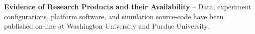\textbf{Evidence of Research Products and their Availability} -- Data, experiment configurations, platform software, and simulation source-code have been published on-line at Washington University and Purdue University.

\begin{comment}
\vspace{0.1in}
\noindent
{\large\bf Very Energetic Radiation Imaging Telescope Array (VERITAS) Project}
{\bf (J. Buckley)}

This work was covered by a combination of a DOE research grant as well
as project funds in the form of DOE and NSF/Physics subcontracts
through the Smithsonian Astrophysical Observatory project office.

\textbf{Intellectual Merit} -- Significant products of the
work include the VERITAS FADC electronics and a number of scientific
results summarized in
\cite{2016MNRAS.461..202A,2016arXiv160901692A,2016arXiv160806464A,2016arXiv160801569A,2016MNRAS.459.2550A,2016ApJ...821..129A,2016ApJ...819..156B,2016ApJ...818L..33A,2016ApJ...817L...7A,2015ApJ...815L..22A,2015PhRvL.115u1103C,2015PhRvD..91l9903A,2015A&A...578A..22A,2015A&A...576A.126A,2015PDU.....7...16B,2015ApJ...800...61A,2015ApJ...799....7A,2014ApJ...797...89A,2014ApJ...795L...3A,2014ApJ...790..149A,2014ApJ...788..158A,2014ApJ...788...78A,2014ApJ...787..166A,2014ApJ...783...16A,2014ApJ...782...13A,2014APh....54....1A,2014arXiv1401.6085F,2014ApJ...780..168A,2013ApJ...779...92A,2013arXiv1310.8621A,2013arXiv1310.7040B,2013arXiv1310.5662B,2013ApJ...776...69A,2013arXiv1308.6173V,2013arXiv1307.4962P,2013arXiv1307.2807D,2013ApJ...770...93A,2013arXiv1305.0302W,2013arXiv1304.6367S,2013APh....43....3A,2013ApJ...764...38A,2013ApJ...762...92A}.
A founding member of VERITAS, Dr.\ Buckley was responsible for the design
and construction of the 2000-channel 500 Msps VERITAS FADC system.
He also played a leading role in establishing the scientific
programs for dark matter, multiwavelength studies of active galaxies
and observations of supernova remnants. Scientific highlights of
VERITAS include (1) DM limits on dwarf
galaxies\cite{2017PhRvD..95h2001A,2015PhRvD..91l9903A,2012PhRvD..85f2001A},
(2) resolved images and spectra from supernova remnants (SNR) leading
to direct evidence for the origin of hadronic cosmic rays in SNR
\cite{2017ApJ...836...23A,2013ApJ...764...38A,2013ApJ...770...93A,2010ApJ...719L..69A,2009ApJ...698L.133A},
(3) discovery of periodic emission from the Crab pulsar up to $>$100
GeV challenging current models of pulsar magnetospheres
\cite{2011Sci...334...69V}), (4) measurements of spectral variability
of active galaxies (AGNs) with multiwavelength data providing new
constraints on conditions near the central supermassive black hole
(e.g.,
\cite{2009ApJ...707..612A,2008ApJ...684L..73A,2011ApJ...726...43A,2009ApJ...691L..13D,2017ApJ...834....2A})
and (5) constraints on the extragalactic background light,
Lorentz-invariance violation and intergalactic magnetic fields
\cite{2012ApJ...750...94A,2010ApJ...708L.100A}.

\textbf{Broader Impacts} -- Information on VERITAS was disseminated to the
general public through YouTube videos, public site tours, and informational
displays at the Smithsonian Astrophysical Observatories. 

\textbf{Evidence of Research Products and their Availability} --

\end{comment}
